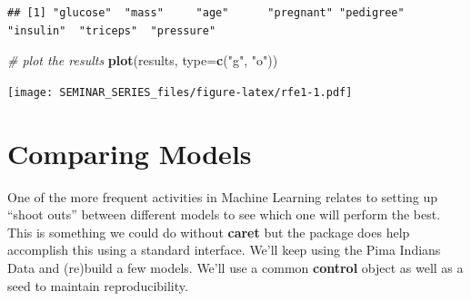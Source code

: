 \documentclass[
]{book}
\newenvironment{Shaded}{\begin{snugshade}}{\end{snugshade}}
\newcommand{\CommentTok}[1]{\textcolor[rgb]{0.56,0.35,0.01}{\textit{#1}}}
\newcommand{\DataTypeTok}[1]{\textcolor[rgb]{0.13,0.29,0.53}{#1}}
\newcommand{\KeywordTok}[1]{\textcolor[rgb]{0.13,0.29,0.53}{\textbf{#1}}}
\newcommand{\NormalTok}[1]{#1}
\newcommand{\StringTok}[1]{\textcolor[rgb]{0.31,0.60,0.02}{#1}}
\begin{document}
\begin{verbatim}
## [1] "glucose"  "mass"     "age"      "pregnant" "pedigree" "insulin"  "triceps"  "pressure"
\end{verbatim}

\begin{Shaded}
\begin{Highlighting}[]
\CommentTok{# plot the results}
\KeywordTok{plot}\NormalTok{(results, }\DataTypeTok{type=}\KeywordTok{c}\NormalTok{(}\StringTok{"g"}\NormalTok{, }\StringTok{"o"}\NormalTok{))}
\end{Highlighting}
\end{Shaded}

\texttt{[image: SEMINAR\_SERIES\_files/figure-latex/rfe1-1.pdf]}

\hypertarget{comparing-models}{%
\chapter{Comparing Models}\label{comparing-models}}

One of the more frequent activities in Machine Learning relates to setting up ``shoot outs'' between different models to see which one will perform the best. This is something we could do without \textbf{caret} but the package does help accomplish this using a standard interface. We'll keep using the Pima Indians Data and (re)build a few models. We'll use a common \textbf{control} object as well as a seed to maintain reproducibility.
\end{document}

